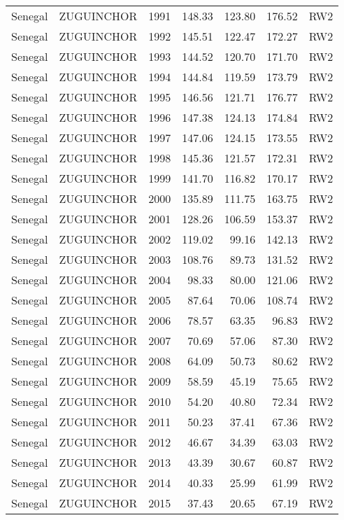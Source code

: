 \begin{longtable}{lllrrrl}
  Senegal & ZUGUINCHOR & 1991 & 148.33 & 123.80 & 176.52 & RW2 \\ 
  Senegal & ZUGUINCHOR & 1992 & 145.51 & 122.47 & 172.27 & RW2 \\ 
  Senegal & ZUGUINCHOR & 1993 & 144.52 & 120.70 & 171.70 & RW2 \\ 
  Senegal & ZUGUINCHOR & 1994 & 144.84 & 119.59 & 173.79 & RW2 \\ 
  Senegal & ZUGUINCHOR & 1995 & 146.56 & 121.71 & 176.77 & RW2 \\ 
  Senegal & ZUGUINCHOR & 1996 & 147.38 & 124.13 & 174.84 & RW2 \\ 
  Senegal & ZUGUINCHOR & 1997 & 147.06 & 124.15 & 173.55 & RW2 \\ 
  Senegal & ZUGUINCHOR & 1998 & 145.36 & 121.57 & 172.31 & RW2 \\ 
  Senegal & ZUGUINCHOR & 1999 & 141.70 & 116.82 & 170.17 & RW2 \\ 
  Senegal & ZUGUINCHOR & 2000 & 135.89 & 111.75 & 163.75 & RW2 \\ 
  Senegal & ZUGUINCHOR & 2001 & 128.26 & 106.59 & 153.37 & RW2 \\ 
  Senegal & ZUGUINCHOR & 2002 & 119.02 & 99.16 & 142.13 & RW2 \\ 
  Senegal & ZUGUINCHOR & 2003 & 108.76 & 89.73 & 131.52 & RW2 \\ 
  Senegal & ZUGUINCHOR & 2004 & 98.33 & 80.00 & 121.06 & RW2 \\ 
  Senegal & ZUGUINCHOR & 2005 & 87.64 & 70.06 & 108.74 & RW2 \\ 
  Senegal & ZUGUINCHOR & 2006 & 78.57 & 63.35 & 96.83 & RW2 \\ 
  Senegal & ZUGUINCHOR & 2007 & 70.69 & 57.06 & 87.30 & RW2 \\ 
  Senegal & ZUGUINCHOR & 2008 & 64.09 & 50.73 & 80.62 & RW2 \\ 
  Senegal & ZUGUINCHOR & 2009 & 58.59 & 45.19 & 75.65 & RW2 \\ 
  Senegal & ZUGUINCHOR & 2010 & 54.20 & 40.80 & 72.34 & RW2 \\ 
  Senegal & ZUGUINCHOR & 2011 & 50.23 & 37.41 & 67.36 & RW2 \\ 
  Senegal & ZUGUINCHOR & 2012 & 46.67 & 34.39 & 63.03 & RW2 \\ 
  Senegal & ZUGUINCHOR & 2013 & 43.39 & 30.67 & 60.87 & RW2 \\ 
  Senegal & ZUGUINCHOR & 2014 & 40.33 & 25.99 & 61.99 & RW2 \\ 
  Senegal & ZUGUINCHOR & 2015 & 37.43 & 20.65 & 67.19 & RW2 \\ 

\end{longtable}
